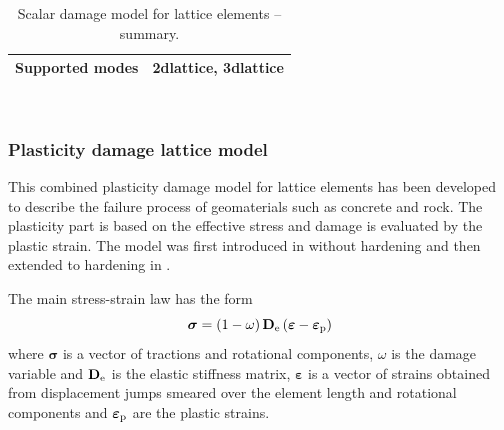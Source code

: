 \documentclass[a4paper]{article}
\newenvironment{mmt}{\begin{tabular}{|l|p{9cm}|}}{\end{tabular}\\}
\newenvironment{mmt}{\begin{tabular}{|l|l|}}{\end{tabular}\\}
\begin{document}
\begin{table}[!htb]
\begin{mmt}
Supported modes& 2dlattice, 3dlattice\\
\hline
\end{mmt}
\caption{Scalar damage model for lattice elements -- summary.}
\label{latticedamage_table}
\end{table}

\subsubsection{Plasticity damage lattice model}

This combined plasticity damage model for lattice elements has been developed to describe the failure process of geomaterials such as concrete and rock. The plasticity part is based on the effective stress and damage is evaluated by the plastic strain. The model was first introduced in \cite{GraDav11} without hardening and then extended to hardening in \cite{AthWheGra18}.

The main stress-strain law has the form
\begin{equation}
\boldsymbol{\sigma} = \left(1-\omega\right) \mathbf{D}_{\rm e} \left(\boldsymbol{\varepsilon}-\boldsymbol{\varepsilon}_{\rm p} \right)
\end{equation}
where $\boldsymbol{\sigma}$ is a vector of tractions and rotational components, $\omega$ is the damage variable and $\mathbf{D}_{\rm e}$ is the elastic stiffness matrix, $\boldsymbol{\varepsilon}$ is a vector of strains obtained from displacement jumps smeared over the element length and rotational components and $\boldsymbol{\varepsilon}_{\rm p}$ are the plastic strains.
\end{document}
